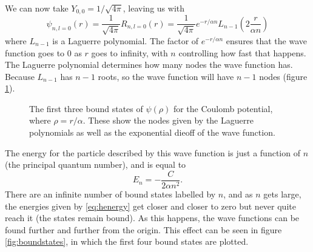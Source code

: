 \documentclass[12pt,twoside]{reedthesis}
\newcommand{\eqn}[1]{\begin{equation}#1\end{equation}}
\begin{document}
We can now take $Y_{0,0} = 1/\sqrt{4 \pi}$, leaving us with
\eqn{
\psi_{n, l =0}(r) = \frac{1}{\sqrt{4\pi}}R_{n , l= 0}(r) = \frac{1}{\sqrt{4\pi}} e^{-r /\alpha n}L_{n-1} \left(2\frac{r}{ \alpha n}\right)
\label{eq:SWE-coulomb}
}
where $L_{n-1}$ is a Laguerre polynomial. The factor of $e^{-r /\alpha n}$ ensures that the wave function goes to 0 as $r$ goes to infinity, with $n$ controlling how fast that happens. The Laguerre polynomial determines how many nodes the wave function has. Because $L_{n-1}$ has $n-1$ roots, so the wave function will have $n-1$ nodes (figure \ref{fig:wavefunctions}).
\begin{figure}[h]
\centering
{}
\caption[The first three bound states of $\psi(\rho)$ for the Coulomb potential]{The first three bound states of $\psi(\rho)$ for the Coulomb potential, where $\rho = r/\alpha$. These show the nodes given by the Laguerre polynomials as well as the exponential dieoff of the wave function.}
\label{fig:wavefunctions}
\end{figure}

The energy for the particle described by this wave function is just a function of $n$ (the principal quantum number), and is equal to
\eqn{
E_n = -\frac{C}{2\alpha n^2}\mbox{.}
\label{eq:henergy}
}
There are an infinite number of bound states labelled by $n$, and as $n$ gets large, the energies given by \eqref{eq:henergy} get closer and closer to zero but never quite reach it (the states remain bound). As this happens, the wave functions can be found further and further from the origin. This effect can be seen in figure \ref{fig:boundstates}, in which the first four bound states are plotted.
\end{document}
